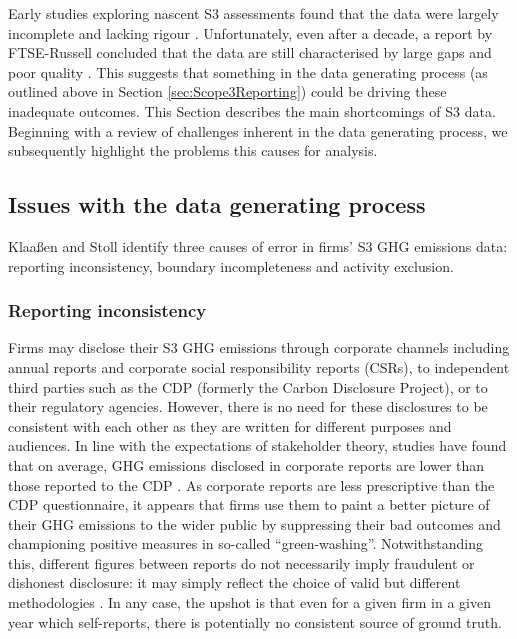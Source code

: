 \documentclass[12pt,twoside]{report}
\begin{document}
Early studies exploring nascent S3 assessments found that the data were largely incomplete and lacking rigour \cite{DownieStubbs2013}. Unfortunately, even after a decade, a report by FTSE-Russell concluded that the data are still characterised by large gaps and poor quality \cite{ftserussell2024}. This suggests that something in the data generating process (as outlined above in Section \ref{sec:Scope3Reporting}) could be driving these inadequate outcomes. This Section describes the main shortcomings of S3 data. Beginning with a review of challenges inherent in the data generating process, we subsequently highlight the problems this causes for analysis. 

\subsection{Issues with the data generating process}\label{sec:DataGenIssues}

Klaaßen and Stoll \cite{klassenstoll2021} identify three causes of error in firms' S3 GHG emissions data: reporting inconsistency, boundary incompleteness and activity exclusion. 

\subsubsection{Reporting inconsistency}

Firms may disclose their S3 GHG emissions through corporate channels including annual reports and corporate social responsibility reports (CSRs), to independent third parties such as the CDP (formerly the Carbon Disclosure Project), or to their regulatory agencies. However, there is no need for these disclosures to be consistent with each other as they are written for different purposes and audiences. In line with the expectations of stakeholder theory, studies have found that on average, GHG emissions disclosed in corporate reports are lower than those reported to the CDP \cite{depoers2016, klassenstoll2021}. As corporate reports are less prescriptive than the CDP questionnaire, it appears that firms use them to paint a better picture of their GHG emissions to the wider public by suppressing their bad outcomes and championing positive measures in so-called ``green-washing''. Notwithstanding this, different figures between reports do not necessarily imply fraudulent or dishonest disclosure: it may simply reflect the choice of valid but different methodologies \cite{depoers2016}. In any case, the upshot is that even for a given firm in a given year which self-reports, there is potentially no consistent source of ground truth. 
\end{document}
